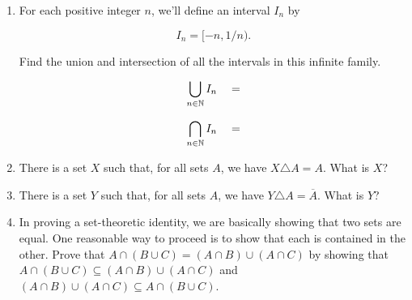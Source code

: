 \begin{enumerate}
\wbvfill

\workbookpagebreak

\item For each positive integer $n$, we'll define an interval $I_n$
by

\[ I_n = [-n, 1/n). \]

Find the union and intersection of all the intervals in this infinite family.

\[ \bigcup_{n \in {\mathbb N}} I_n \quad = \]

\[ \bigcap_{n \in {\mathbb N}} I_n \quad = \]


\wbvfill

\workbookpagebreak

\item There is a set $X$ such that, for all sets $A$, we have 
$X \triangle A = A$.  What is $X$?

\wbvfill

\item There is a set $Y$ such that, for all sets $A$, we have 
$Y \triangle A = \overline{A}$.  What is $Y$?


\wbvfill

\workbookpagebreak

\item In proving a set-theoretic identity, we are basically showing that
two sets are equal.  One reasonable way to proceed is to show that
each is contained in the other.  Prove that 
$A \cap (B \cup C) = (A \cap B) \cup (A \cap C)$ by showing that 
$A \cap (B \cup C) \subseteq (A \cap B) \cup (A \cap C)$ and 
$(A \cap B) \cup (A \cap C) \subseteq A \cap (B \cup C)$.


\end{enumerate}
